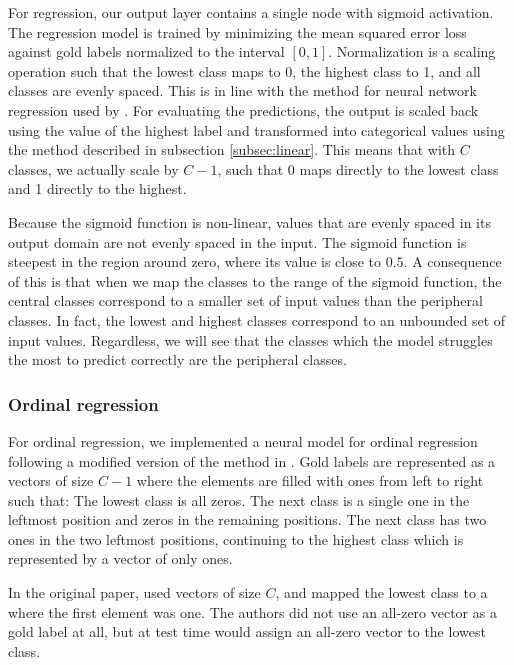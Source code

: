For regression, our output layer contains a single node with sigmoid
activation. The regression model is trained by minimizing the mean squared
error loss against gold labels normalized to the interval $[0, 1]$.
Normalization is a scaling operation such that the lowest class maps to 0,
the highest class to 1, and all classes are evenly spaced. This is in line
with the method for neural network regression used by \textcite{taghipour16}.
For evaluating the predictions, the output is scaled back using the value of
the highest label and transformed into categorical values using the method
described in subsection \ref{subsec:linear}. This means that with $C$ classes,
we actually scale by $C-1$, such that 0 maps directly to the lowest class and
1 directly to the highest.

Because the sigmoid function is non-linear, values that are evenly spaced in
its output domain are not evenly spaced in the input. The sigmoid function is
steepest in the region around zero, where its value is close to $0.5$. A
consequence of this is that when we map the classes to the range of the
sigmoid function, the central classes correspond to a smaller set of input
values than the peripheral classes. In fact, the lowest and highest classes
correspond to an unbounded set of input values. Regardless, we will see that
the classes which the model struggles the most to predict correctly are the
peripheral classes.

\subsubsection{Ordinal regression} \label{subsec:ordreg}

For ordinal regression, we implemented a neural model for ordinal regression
following a modified version of the method in \textcite{cheng2008neural}.
Gold labels are represented as a vectors of size $C-1$ where the elements are
filled with ones from left to right such that: The lowest class is all zeros.
The next class is a single one in the leftmost position and zeros in the
remaining positions. The next class has two ones in the two leftmost
positions, continuing to the highest class which is represented by a vector
of only ones.

In the original paper, \citeauthor{cheng2008neural} used vectors of size $C$,
and mapped the lowest class to a where the first element was one. The authors
did not use an all-zero vector as a gold label at all, but at test time would
assign an all-zero vector to the lowest class.


